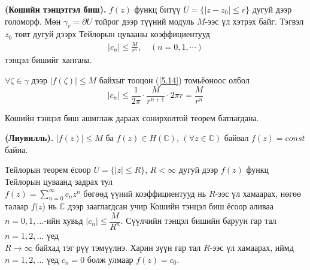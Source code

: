 \begin{cor}
\textbf{(Кошийн тэнцэтгэл биш). } 
$f(z)$ функц битүү $\overline{U}=\{|z-z_0|\leq r\}$ дугуй дээр голоморф. Мөн $\gamma_r =\partial U$ тойрог дээр түүний модуль $M$-ээс үл хэтрэх байг. Тэгвэл $z_0$ төвт дугуй дээрх Тейлорын цувааны коэффициентууд 
\begin{eqnarray}
    |c_n|\leq \frac{M}{r^{n}}, \quad (n=0,1,\cdots)
\end{eqnarray}
тэнцэл бишийг хангана.
\end{cor}
\begin{prf}
$\forall \zeta \in \gamma$ дээр $|f(\zeta)| \leq M$ байхыг тооцон (\ref{5.14}) томьёоноос олбол
$$|c_n|\leq \frac{1}{2\pi}\cdot \frac{M}{r^{n+1}}\cdot 2\pi r =\frac{M}{r^n}$$
 \end{prf}
Кошийн тэнцэл биш ашиглаж дараах сонирхолтой теорем батлагдана.
\begin{thm}
\textbf{(Лиувилль).}  $|f(z)|\leq M$ ба $f(z)\in H(\mathbb{C})$, $(\forall z\in \mathbb{C})$ байвал $f(z)=const $ байна. 
\end{thm}
\begin{prf}
Тейлорын теорем ёсоор $\overline{ U}=\{|z|\leq R\}$, $R<\infty$ дугуй дээр $f(z)$ функц Тейлорын цуваанд задрах тул \\ $f(z)=\sum\limits_{n=0}^\infty c_n z^n$ бөгөөд үүний коэффициентууд нь $R$-ээс үл хамаарах, нөгөө талаар $f(z$) нь $\mathbb{C}$ дээр зааглагдсан учир Кошийн тэнцэл биш ёсоор аливаа $n=0,1,\ldots$-ийн хувьд $|c_n|\leq \dfrac{M}{R^n}$.
Сүүлчийн тэнцэл бишийн баруун гар тал $n=1,2,\ldots$ үед \\ $R\rightarrow \infty$ байхад тэг рүү тэмүүлнэ. Харин зүүн гар тал $R$-ээс үл хамаарах, иймд $n=1,2,\ldots$ үед $c_n=0$ болж улмаар $f(z)=c_0.$
 \end{prf}


